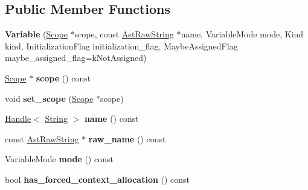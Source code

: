 \subsection*{Public Member Functions}
\begin{DoxyCompactItemize}
\item 
{\bfseries Variable} (\hyperlink{classv8_1_1internal_1_1_scope}{Scope} $\ast$scope, const \hyperlink{classv8_1_1internal_1_1_ast_raw_string}{Ast\+Raw\+String} $\ast$name, Variable\+Mode mode, Kind kind, Initialization\+Flag initialization\+\_\+flag, Maybe\+Assigned\+Flag maybe\+\_\+assigned\+\_\+flag=k\+Not\+Assigned)\hypertarget{classv8_1_1internal_1_1_variable_ad8e21ae67f0ed8a7c28e88fe87392b0e}{}\label{classv8_1_1internal_1_1_variable_ad8e21ae67f0ed8a7c28e88fe87392b0e}

\item 
\hyperlink{classv8_1_1internal_1_1_scope}{Scope} $\ast$ {\bfseries scope} () const \hypertarget{classv8_1_1internal_1_1_variable_a5fe7f7fb3c199cb4b5ce46f10a60a527}{}\label{classv8_1_1internal_1_1_variable_a5fe7f7fb3c199cb4b5ce46f10a60a527}

\item 
void {\bfseries set\+\_\+scope} (\hyperlink{classv8_1_1internal_1_1_scope}{Scope} $\ast$scope)\hypertarget{classv8_1_1internal_1_1_variable_ade5293caabe38c5cea85b14433b1188e}{}\label{classv8_1_1internal_1_1_variable_ade5293caabe38c5cea85b14433b1188e}

\item 
\hyperlink{classv8_1_1internal_1_1_handle}{Handle}$<$ \hyperlink{classv8_1_1internal_1_1_string}{String} $>$ {\bfseries name} () const \hypertarget{classv8_1_1internal_1_1_variable_a0be10ed92501eb309683ac72d484bda8}{}\label{classv8_1_1internal_1_1_variable_a0be10ed92501eb309683ac72d484bda8}

\item 
const \hyperlink{classv8_1_1internal_1_1_ast_raw_string}{Ast\+Raw\+String} $\ast$ {\bfseries raw\+\_\+name} () const \hypertarget{classv8_1_1internal_1_1_variable_addf4d44d461ddab779dfcfcc86b34cc8}{}\label{classv8_1_1internal_1_1_variable_addf4d44d461ddab779dfcfcc86b34cc8}

\item 
Variable\+Mode {\bfseries mode} () const \hypertarget{classv8_1_1internal_1_1_variable_a3c1c45ca5652d524371b6f2e6faae887}{}\label{classv8_1_1internal_1_1_variable_a3c1c45ca5652d524371b6f2e6faae887}

\item 
bool {\bfseries has\+\_\+forced\+\_\+context\+\_\+allocation} () const \hypertarget{classv8_1_1internal_1_1_variable_a0b0b9579314a6ba45c79aea6ef784701}{}\label{classv8_1_1internal_1_1_variable_a0b0b9579314a6ba45c79aea6ef784701}


\end{DoxyCompactItemize}
